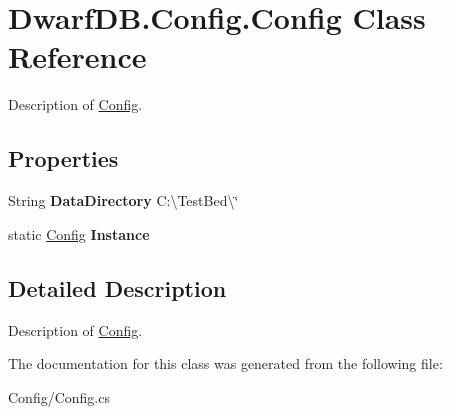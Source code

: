 \hypertarget{class_dwarf_d_b_1_1_config_1_1_config}{\section{Dwarf\+D\+B.\+Config.\+Config Class Reference}
\label{class_dwarf_d_b_1_1_config_1_1_config}
}


Description of \hyperlink{class_dwarf_d_b_1_1_config_1_1_config}{Config}.  


\subsection*{Properties}
\begin{DoxyCompactItemize}
\item 
\hypertarget{class_dwarf_d_b_1_1_config_1_1_config_afcb080c4360c0c344d2b9d9ecb72c297}{String {\bfseries Data\+Directory} C\+:\textbackslash{}\+Test\+Bed\textbackslash{}\char`\"{}}\label{class_dwarf_d_b_1_1_config_1_1_config_afcb080c4360c0c344d2b9d9ecb72c297}

\item 
\hypertarget{class_dwarf_d_b_1_1_config_1_1_config_af1db0cd463b4f00c1a1b7fd4373b230a}{static \hyperlink{class_dwarf_d_b_1_1_config_1_1_config}{Config} {\bfseries Instance}}\label{class_dwarf_d_b_1_1_config_1_1_config_af1db0cd463b4f00c1a1b7fd4373b230a}

\end{DoxyCompactItemize}


\subsection{Detailed Description}
Description of \hyperlink{class_dwarf_d_b_1_1_config_1_1_config}{Config}. 



The documentation for this class was generated from the following file\+:\begin{DoxyCompactItemize}
\item 
Config/Config.\+cs\end{DoxyCompactItemize}
